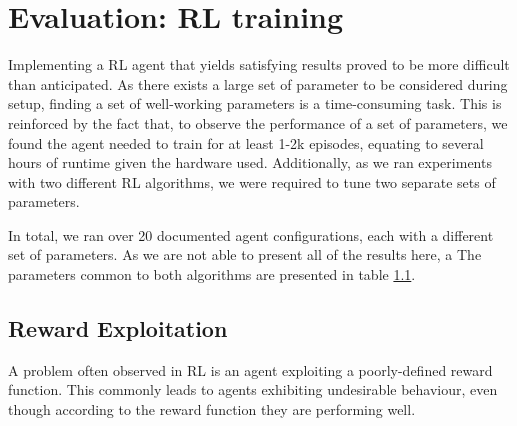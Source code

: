 \section{Evaluation: RL training}

Implementing a RL agent that yields satisfying results proved to be more difficult than anticipated.
As there exists a large set of parameter to be considered during setup, finding a set of well-working parameters is a time-consuming task.
This is reinforced by the fact that, to observe the performance of a set of parameters, we found the agent needed to train for at least 1-2k episodes, equating to several hours of runtime given the hardware used.
Additionally, as we ran experiments with two different RL algorithms, we were required to tune two separate sets of parameters.

In total, we ran over 20 documented agent configurations, each with a different set of parameters.
As we are not able to present all of the results here, a 
The parameters common to both algorithms are presented in table \ref{}.

\subsection{Reward Exploitation}
A problem often observed in RL is an agent exploiting a poorly-defined reward function.
This commonly leads to agents exhibiting undesirable behaviour, even though according to the reward function they are performing well.

